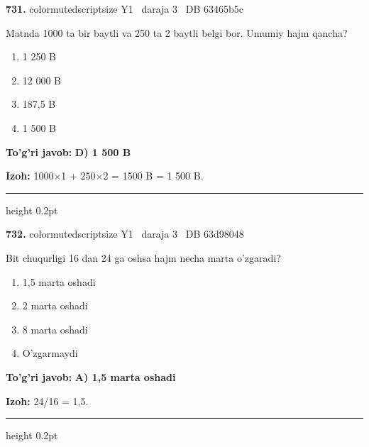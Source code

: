\documentclass[10pt,a4paper,oneside]{article}
\begin{document}
\noindent\textbf{\color{ink}731.}  {color{muted}scriptsize Y1 \textbullet\ daraja 3 \textbullet\ DB 63465b5c}
\par
Matnda 1000 ta bir baytli va 250 ta 2 baytli belgi bor. Umumiy hajm qancha?
\begin{enumerate}[label=\Alph*),leftmargin=9mm]
\item 1 250 B
\item 12 000 B
\item 187,5 B
\item 1 500 B
\end{enumerate}
\begin{tcolorbox}[enhanced,breakable,colback=teal!4,colframe=teal!50!black,boxrule=0.5pt,arc=1.1mm,left=3mm,right=3mm,top=1.7mm,bottom=1.7mm,before skip=2mm,after skip=2mm]
\textbf{\color{teal}To'g'ri javob:} \textbf{D) 1 500 B}
\par\smallskip
\textbf{Izoh:} 1000\ensuremath{\times}1 + 250\ensuremath{\times}2 = 1500 B = 1 500 B.
\end{tcolorbox}
\vspace{2mm}\hrule height 0.2pt \vspace{3mm}

\noindent\textbf{\color{ink}732.}  {color{muted}scriptsize Y1 \textbullet\ daraja 3 \textbullet\ DB 63d98048}
\par
Bit chuqurligi 16 dan 24 ga oshsa hajm necha marta o'zgaradi?
\begin{enumerate}[label=\Alph*),leftmargin=9mm]
\item 1,5 marta oshadi
\item 2 marta oshadi
\item 8 marta oshadi
\item O'zgarmaydi
\end{enumerate}
\begin{tcolorbox}[enhanced,breakable,colback=teal!4,colframe=teal!50!black,boxrule=0.5pt,arc=1.1mm,left=3mm,right=3mm,top=1.7mm,bottom=1.7mm,before skip=2mm,after skip=2mm]
\textbf{\color{teal}To'g'ri javob:} \textbf{A) 1,5 marta oshadi}
\par\smallskip
\textbf{Izoh:} 24/16 = 1,5.
\end{tcolorbox}
\vspace{2mm}\hrule height 0.2pt \vspace{3mm}
\end{document}
